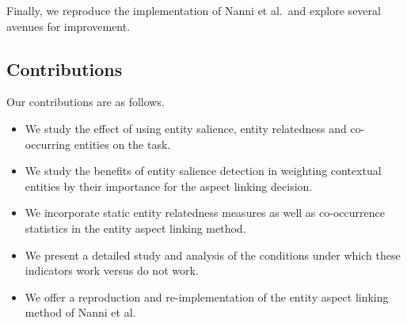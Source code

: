 Finally, we reproduce the implementation of Nanni et al.\ and explore several avenues for improvement.



\subsection{Contributions}


Our contributions are as follows.
\begin{itemize}

    \item We study the effect of using entity salience, entity relatedness and co-occurring entities on the task.
    \item We study the benefits of entity salience detection in weighting contextual entities by their importance for the aspect linking decision. 
    \item We incorporate static entity relatedness measures as well as co-occurrence statistics in the entity aspect linking method.
    \item We present a detailed study and analysis of the conditions under which these indicators work versus do not work. 
    \item We offer a reproduction and re-implementation of the entity aspect linking method of Nanni et al. \cite{nanni2018entity}
\end{itemize}

